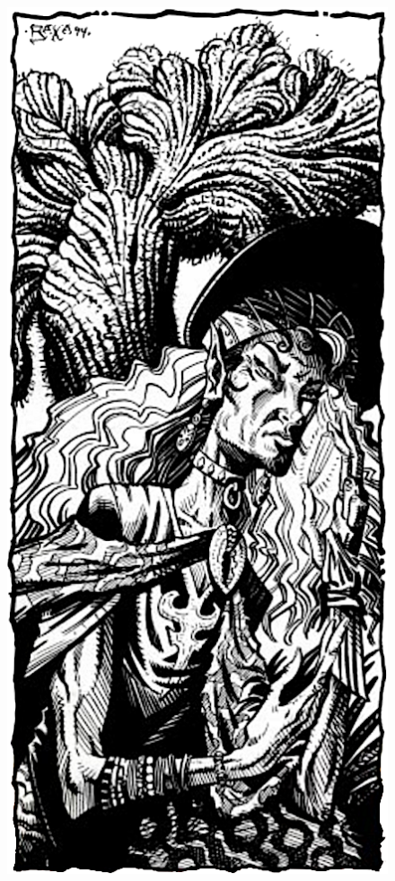 \begin{figure}[t!]
\centering
\includegraphics[width=\columnwidth-2mm]{images/psion-3.png}
\WOTC
\end{figure}


